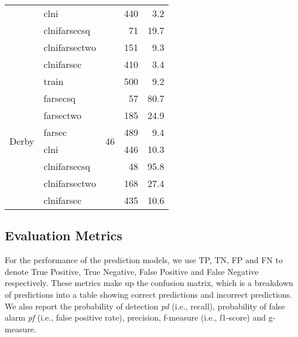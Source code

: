 \begin{table}[!htbp]
\begin{tabular}{c|l|c|r|r}
 & clni &  & 440 & 3.2 \\  
 & clnifarsecsq &  & 71 & 19.7 \\  
 & clnifarsectwo &  & 151 & 9.3 \\  
 & clnifarsec &  & 410 & 3.4 \\ \hline
\multirow{8}{*}{Derby} & train & \multirow{8}{*}{46} & 500 & 9.2 \\  
 & farsecsq &  & 57 & 80.7 \\  
 & farsectwo &  & 185 & 24.9 \\  
 & farsec &  & 489 & 9.4 \\  
 & clni &  & 446 & 10.3 \\  
 & clnifarsecsq &  & 48 & 95.8 \\  
 & clnifarsectwo &  & 168 & 27.4 \\  
 & clnifarsec &  & 435 & 10.6 \\ \hline
\end{tabular}
\label{tbl:farsecDataset}
\end{table}


\subsection{Evaluation Metrics}

For the performance of the prediction models, we use TP, TN, FP and FN to denote True Positive, True Negative, False Positive and False Negative respectively. These metrics make up the confusion matrix, which is a breakdown of predictions into a table showing correct predictions and incorrect predictions. We also report the probability of detection \textit{pd} (i.e., recall), probability of false alarm \textit{pf} (i.e., false positive rate), precision, f-measure (i.e., f1-score) and g-measure. 




